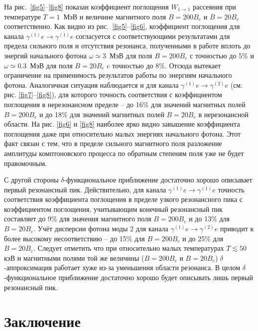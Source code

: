 \documentclass[cp1251%
               ]{jetp} %
\begin{document}
На рис.~\ref{fig5}--\ref{fig8} показан  коэффициент поглощения $W_{1\to1}$ рассеяния при температуре $T=1 $~МэВ и величине магнитного поля $B=200B_e$ и $B=20B_e$ соответственно. Как видно из рис.~\ref{fig5}--\ref{fig6}, коэффициент поглощения для канала $\gamma^{(1)}e\to\gamma^{(1)}e$ согласуется с соответствующими результатами для предела сильного поля и отсутствия резонанса, полученными в работе \cite{Chistyakov:2009} вплоть до энергий начального фотона  $\omega\simeq3$~МэВ для поля $B=200B_e$ с точностью до 5\% и  $\omega\simeq0.3$~МэВ для поля $B=20B_e$ c точностью до 8\%. Отсюда вытекает ограничение на применимость результатов работы \cite{Chistyakov:2009} по энергиям начального фотона. Аналогичная ситуация наблюдается и для канала $\gamma^{(1)}e\to\gamma^{(2)}e$ (см. рис. \ref{fig7}--\ref{fig8}), для которого точность соответствия с коэффициентом поглощения в нерезонансном пределе -- до 16\% для значений магнитных полей $B=200B_e$ и до 18\% для значений магнитных полей $B=20B_e$ в нерезонансной области.  На рис. \ref{fig6} и \ref{fig8} наиболее ярко видно завышение коэффициента поглощения даже при относительно малых энергиях начального фотона. Этот факт связан с тем, что в пределе сильного магнитного поля разложение амплитуды комптоновского процесса по обратным степеням поля уже не будет правомочным.

С  другой стороны $\delta$-функциональное приближение достаточно хорошо описывает первый резонансный пик. Действительно, для канала $\gamma^{(1)}e\to\gamma^{(1)}e$ точность соответствия коэффициента поглощения в пределе узкого резонансного пика с коэффициентом поглощения, учитывающим конечный резонансный пик составляет до 9\% для значения магнитного поля $B=200B_e$ и до 13\% для $B=20 B_e$. Учёт дисперсии фотона моды 2 для канала $\gamma^{(1)}e\to\gamma^{(2)}e$ приводит к более высокому несоответствию -- до 15\% для $B=200B_e$ и до 25\% для $B=20B_e$.
Следует отметить   что при относительно малых температурах $T\lesssim50$ кэВ и магнитными полями той же величины ($B = 200 B_e$ и $B = 20 B_e$) $\delta$-аппроксимация работает хуже из-за уменьшения области резонанса. В целом $\delta$-функциональное приближение достаточно хорошо будет описывать лишь первый резонансный пик.






\section{Заключение}
\end{document}
